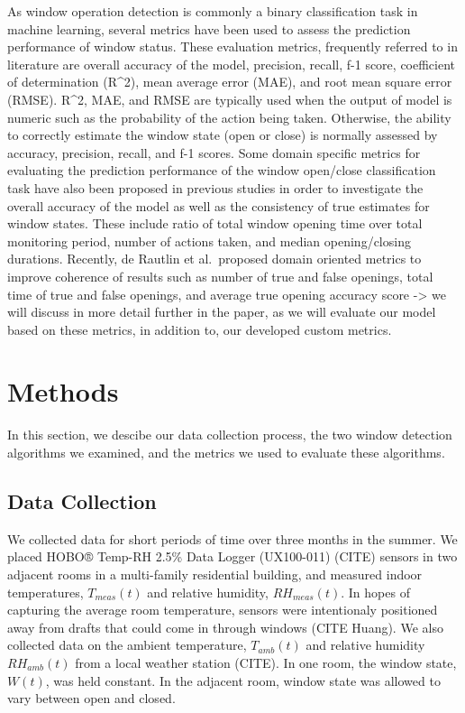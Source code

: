 \documentclass[sigconf]{acmart}
\begin{document}
As window operation detection is commonly a binary classification task
in machine learning, several metrics have been used to assess the
prediction performance of window status. These evaluation metrics,
frequently referred to in literature are overall accuracy of the model,
precision, recall, f-1 score, coefficient of determination (R\^{}2),
mean average error (MAE), and root mean square error (RMSE). R\^{}2,
MAE, and RMSE are typically used when the output of model is numeric
such as the probability of the action being taken. Otherwise, the
ability to correctly estimate the window state (open or close) is
normally assessed by accuracy, precision, recall, and f-1 scores. Some
domain specific metrics for evaluating the prediction performance of the
window open/close classification task have also been proposed in
previous studies in order to investigate the overall accuracy of the
model as well as the consistency of true estimates for window states.
These include ratio of total window opening time over total monitoring
period, number of actions taken, and median opening/closing durations.
Recently, de Rautlin et al.~proposed domain oriented metrics to improve
coherence of results such as number of true and false openings, total
time of true and false openings, and average true opening accuracy score
-\textgreater{} we will discuss in more detail further in the paper, as
we will evaluate our model based on these metrics, in addition to, our
developed custom metrics.

\hypertarget{methods}{%
\section{Methods}\label{methods}}

In this section, we descibe our data collection process, the two window
detection algorithms we examined, and the metrics we used to evaluate
these algorithms.

\hypertarget{data-collection}{%
\subsection{Data Collection}\label{data-collection}}

We collected data for short periods of time over three months in the
summer. We placed HOBO® Temp-RH 2.5\% Data Logger (UX100-011) (CITE)
sensors in two adjacent rooms in a multi-family residential building,
and measured indoor temperatures, \(T_{meas}(t)\) and relative humidity,
\(RH_{meas}(t)\). In hopes of capturing the average room temperature,
sensors were intentionaly positioned away from drafts that could come in
through windows (CITE Huang). We also collected data on the ambient
temperature, \(T_{amb}(t)\) and relative humidity \(RH_{amb}(t)\) from a
local weather station (CITE). In one room, the window state, \(W(t)\),
was held constant. In the adjacent room, window state was allowed to
vary between open and closed.
\end{document}
